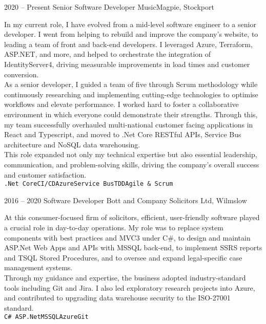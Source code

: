 \documentclass[8pt]{developercv} %
\begin{document}
\begin{entrylist}
    \entry
		{2020 -- Present}
		{Senior Software Developer}
		{MusicMagpie, Stockport}
		{\raggedright In my current role, I have evolved from a mid-level software engineer to a senior developer. I went from helping to rebuild and improve the company's website, to leading a team of front and back-end developers. I leveraged Azure, Terraform, ASP.NET, and more, and helped to orchestrate the integration of IdentityServer4, driving measurable improvements in load times and customer conversion.\\
\vspace{0.1cm}
As a senior developer, I guided a team of five through Scrum methodology while continuously researching and implementing cutting-edge technologies to optimise workflows and elevate performance. I worked hard to foster a collaborative environment in which everyone could demonstrate their strengths. Through this, my team successfully overhauled multi-national customer facing applications in React and Typescript, and moved to .Net Core RESTful APIs, Service Bus architecture and NoSQL data warehousing.\\
\vspace{0.1cm}
This role expanded not only my technical expertise but also essential leadership, communication, and problem-solving skills, driving the company's overall success and customer satisfaction.\\
\vspace{0.1cm}
		\texttt{.Net Core}\slashsep\texttt{CI/CD}\slashsep\texttt{Azure}\slashsep\texttt{Service Bus}\slashsep\texttt{TDD}\slashsep\texttt{Agile \& Scrum}}

\vspace{0.6cm}
	\entry
		{2016 -- 2020}
		{Software Developer}
		{Bott and Company Solicitors Ltd, Wilmslow}
		{\raggedright At this consumer-focused firm of solicitors, efficient, user-friendly software played a crucial role in day-to-day operations. My role was to replace system components with best practices and MVC3 under C\#, to design and maintain ASP.Net Web Apps and APIs with MSSQL back-end, to implement SSRS reports and TSQL Stored Procedures, and to oversee and expand legal-specific case management systems.\\
\vspace{0.1cm}
Through my guidance and expertise, the business adopted industry-standard tools including Git and Jira. I also led exploratory research projects into Azure, and contributed to upgrading data warehouse security to the ISO-27001 standard.\\
\vspace{0.1cm}
		\texttt{C\# ASP.Net}\slashsep\texttt{MSSQL}\slashsep\texttt{Azure}\slashsep\texttt{Git}}
\end{entrylist}
\end{document}
